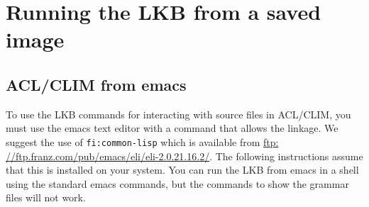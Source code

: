 \documentclass[12pt]{report}
\begin{document}
\section{Running the LKB from a saved image}
\label{images}


\subsection{ACL/CLIM from emacs}
\label{emacs-clim-image}
To use the LKB commands for interacting with source
files in ACL/CLIM, you must use the emacs text editor with 
a command that allows the linkage.  We suggest
the use of {\tt fi:common-lisp} which is available
from \href{ftp: //ftp.franz.com/pub/emacs/eli/eli-2.0.21.16.2/}{ftp: //ftp.franz.com/pub/emacs/eli/eli-2.0.21.16.2/}.  The following
instructions assume that this is installed on your system.
You can run the LKB from emacs in a shell using the standard
emacs commands, but the commands to show the grammar files
will not work.
\end{document}
